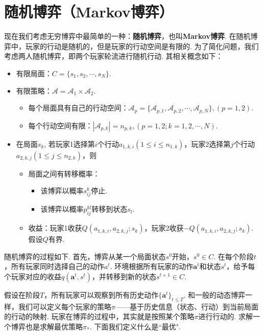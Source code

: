 \section{随机博弈（Markov博弈）}
现在我们考虑无穷博弈中最简单的一种：\textbf{随机博弈}，也叫\textbf{Markov博弈}. 在随机博弈中，玩家的行动是随机的，但是玩家的行动空间是有限的. 为了简化问题，我们考虑两人随机博弈，即两个玩家轮流进行随机行动. 其相关概念如下：
\begin{itemize}
    \item 有限局面：$C=\{s_1,s_2,\cdots,s_N\}$.
    \item 有限策略：$\mathcal A=\mathcal A_1\times \mathcal A_2.$
    \begin{itemize}
        \item 每个局面具有自己的行动空间：$\mathcal A_p = \{\mathcal A_{p,1},\mathcal A_{p,2},\cdots, \mathcal A_{p,N}\}, (p=1,2)$.
        \item 每个行动空间有限：$|\mathcal A_{p,k}|=n_{p,k},(p=1,2;k=1,2,\cdots,N)$.
    \end{itemize}
    \item 在局面$s_k$, 若玩家1选择第$i$个行动$a_{1,k,i}(1\leq i\leq n_{1,k})$，玩家2选择第$j$个行动$a_{2,k,j}(1\leq j\leq n_{2,k})$，则
    
    \begin{itemize}
        \item 局面之间有转移概率：
        \begin{itemize}
            \item 该博弈以概率$s_{ij}^k$停止.
            \item 该博弈以概率$p_{ij}^{kl}$转移到状态$s_l$.
        \end{itemize}
        \item 收益：玩家1收获$Q(a_{1,k,i},a_{2,k,j};s_k)$，玩家2收获$-Q(a_{1,k,i},a_{2,k,j};s_k)$. 假设$Q$有界.
    \end{itemize}
\end{itemize}

随机博弈的过程如下. 首先，博弈从某一个局面状态$s^0$开始，$s^0\in C$. 在每个阶段$t$，所有玩家同时选择自己的动作$a^t$. 环境根据所有玩家的动作$\boldsymbol a^t$和状态$s^t$，给予每个玩家对应的收益$q(\boldsymbol a^t, s^t)$，并转移到新的状态$s^{t+1}\in C$. 

假设在阶段$T$，所有玩家可以观察到所有历史动作$\{\boldsymbol a^t\}_{t\leq T}$. 和一般的动态博弈一样，我们可以定义每个玩家的策略$\pi$——基于历史信息（状态、行动）到当前局面的行动的映射. 玩家在博弈的过程中，其实就是按照某个策略$\pi$进行行动的. 求解一个博弈也是求解最优策略$\pi_*$. 下面我们定义什么是``最优".

